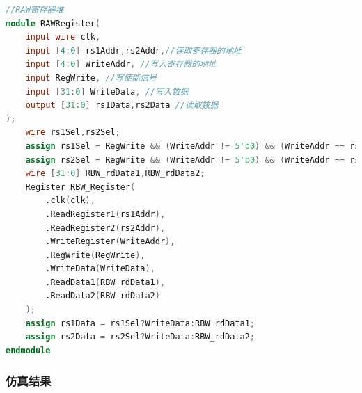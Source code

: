 \documentclass[12pt,hyperref,a4paper,UTF8]{ctexart}
\begin{document}
\begin{lstlisting}[language=Verilog,caption={RAW寄存器堆}]
//RAW寄存器堆
module RAWRegister(
    input wire clk,
    input [4:0] rs1Addr,rs2Addr,//读取寄存器的地址`
    input [4:0] WriteAddr, //写入寄存器的地址
    input RegWrite, //写使能信号
    input [31:0] WriteData, //写入数据
    output [31:0] rs1Data,rs2Data //读取数据
);
    wire rs1Sel,rs2Sel;
    assign rs1Sel = RegWrite && (WriteAddr != 5'b0) && (WriteAddr == rs1Addr);
    assign rs2Sel = RegWrite && (WriteAddr != 5'b0) && (WriteAddr == rs2Addr);
    wire [31:0] RBW_rdData1,RBW_rdData2;
    Register RBW_Register(
        .clk(clk),
        .ReadRegister1(rs1Addr),
        .ReadRegister2(rs2Addr),
        .WriteRegister(WriteAddr),
        .RegWrite(RegWrite),
        .WriteData(WriteData),
        .ReadData1(RBW_rdData1),
        .ReadData2(RBW_rdData2)
    );    
    assign rs1Data = rs1Sel?WriteData:RBW_rdData1;
    assign rs2Data = rs2Sel?WriteData:RBW_rdData2;
endmodule
\end{lstlisting}

















\subsubsection*{\Large  仿真结果}
\normalsize
\end{document}

